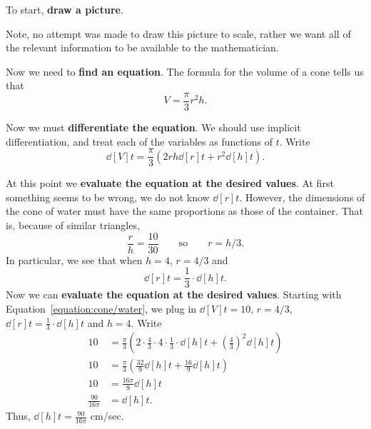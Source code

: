 \begin{solution}
To start, \textbf{draw a picture}.


Note, no attempt was made to draw this picture to scale, rather we
want all of the relevant information to be available to the
mathematician.

Now we need to \textbf{find an equation}. The formula for the volume of a cone tells us that 
\[
V = \frac{\pi}{3} r^2 h.
\]

Now we must \textbf{differentiate the equation}. We should use implicit differentiation, and treat each of the variables as functions of $t$. Write
\begin{equation}\label{equation:cone/water}
\dd[V]{t} = \frac{\pi}{3}\left(2rh \dd[r]{t} + r^2 \dd[h]{t}\right).
\end{equation}

At this point we \textbf{evaluate the equation at the desired values}.
At first something seems to be wrong, we do not know $\dd[r]{t}$.
However, the dimensions of the cone of water must have the same
proportions as those of the container.  That is, because of similar
triangles, 
\[
\frac{r}{h}=\frac{10}{30} \qquad\text{so}\qquad r={h/3}.
\]  
In particular, we see that when $h = 4$, $r=4/3$ and 
\[
\dd[r]{t} = \frac{1}{3}\cdot \dd[h]{t}.
\]
Now we can \textbf{evaluate the equation at the desired
  values}. Starting with Equation~\ref{equation:cone/water}, we plug
in $\dd[V]{t} = 10$, $r = 4/3$, $\dd[r]{t} = \frac{1}{3}\cdot \dd[h]{t}$
and $h=4$. Write
\begin{align*}
10 &= \frac{\pi}{3}\left(2\cdot \frac{4}{3}\cdot 4 \cdot\frac{1}{3}\cdot\dd[h]{t} + \left(\frac{4}{3}\right)^2 \dd[h]{t}\right)\\
10 &= \frac{\pi}{3}\left(\frac{32}{9}\dd[h]{t} + \frac{16}{9} \dd[h]{t}\right)\\
10 &= \frac{16\pi}{9}\dd[h]{t}\\
\frac{90}{16\pi} &= \dd[h]{t}.
\end{align*}
Thus, $\dd[h]{t}=\frac{90}{16\pi}$ cm/sec.
\end{solution}

